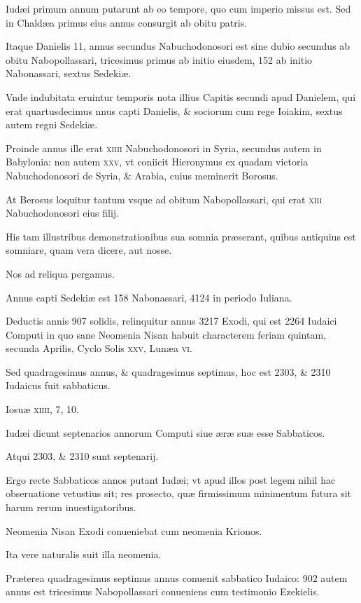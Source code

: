 \begin{parnumbers}
Iudæi primum annum putarunt ab eo tempore, quo
cum imperio missus est. Sed in Chaldæa primus eius annus consurgit
ab obitu patris.

Itaque Danielis 11, annus secundus Nabuchodonosori
est sine dubio secundus ab obitu Nabopollassari, tricesimus
primus ab initio eiusdem, 152 ab initio Nabonassari, sextus
Sedekiæ.

Vnde indubitata eruintur temporis nota illius Capitis secundi
apud Danielem, qui erat quartusdecimus nnus capti Danielis,
\& sociorum cum rege Ioiakim, sextus autem regni Sedekiæ.

Proinde annus ille erat \textsc{xiiii} Nabuchodonosori in Syria, secundus
autem in Babylonia: non autem \textsc{xxv}, vt coniicit Hieronymus
ex quadam victoria Nabuchodonosori de Syria, \& Arabia, cuius
meminerit Borosus.

At Berosus loquitur tantum vsque ad obitum
Nabopollassari, qui erat \textsc{xiii} Nabuchodonosori eius filij.

His tam illustribus demonstrationibus sua somnia præserant, quibus antiquius
est somniare, quam vera dicere, aut nosse.

Nos ad reliqua
pergamus.

Annus capti Sedekiæ est 158 Nabonassari, 4124 in periodo Iuliana.

Deductis annis 907 solidis, relinquitur annus 3217
Exodi, qui est 2264 Iudaici Computi in quo sane Neomenia Nisan
habuit characterem feriam quintam, secunda Aprilis, Cyclo
Solis \textsc{xxv}, Lunæa \textsc{vi}.

Sed quadragesimus annus, \& quadragesimus
septimus, hoc est 2303, \& 2310 Iudaicus fuit sabbaticus.

Iosuæ
\textsc{xiiii}, 7, 10.

Iudæi dicunt septenarios annorum Computi siue æræ
suæ esse Sabbaticos.

Atqui 2303, \& 2310 sunt septenarij.

Ergo recte
Sabbaticos annos putant Iudæi; vt apud illos post legem nihil
hac obseruatione vetustius sit; res prosecto, quæ firmissimum
minimentum futura sit harum rerum inuestigatoribus.

Neomenia Nisan Exodi conueniebat cum neomenia Krionos.

Ita vere naturalis suit illa neomenia.

Præterea quadragesimus septimus
annus conuenit sabbatico Iudaico: 902 autem annus est tricesimus
Nabopollassari conueniens cum testimonio Ezekielis.


\end{parnumbers}

